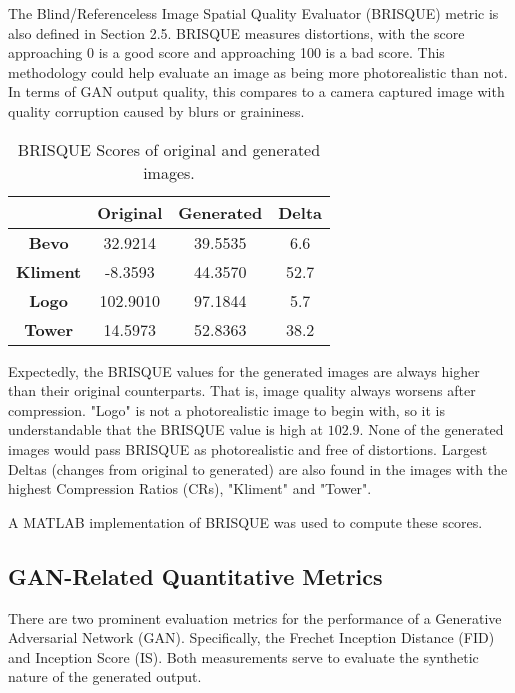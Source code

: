 The Blind/Referenceless Image Spatial Quality Evaluator (BRISQUE) metric is also defined in Section 2.5.
BRISQUE measures distortions, with the score approaching 0 is a good score and approaching 100 is a bad score. 
This methodology could help evaluate an image as being more photorealistic than not. 
In terms of GAN output quality, this compares to a camera captured image with quality corruption 
caused by blurs or graininess.

\begin{table}[H]
    \begin{center}
    \begin{tabular}{|c|c|c|c|}
    \hline
      & Original & Generated & Delta\\ [0.5ex] 
    \hline\hline
    \textbf{Bevo}	& 32.9214 & 39.5535 & 6.6\\
    \textbf{Kliment}	& -8.3593 & 44.3570 & 52.7\\
    \textbf{Logo}	& 102.9010 & 97.1844 & 5.7\\
    \textbf{Tower} & 14.5973 & 52.8363 & 38.2\\\hline
    
    \end{tabular}
    \caption[BRISQUE]{BRISQUE Scores of original and generated images.}
    \end{center}
    \end{table}

Expectedly, the BRISQUE values for the generated images are always higher than
their original counterparts. That is, image quality always worsens after compression. 
"Logo" is not a photorealistic image to begin with, 
so it is understandable that the BRISQUE value is high at $102.9$.
None of the generated images would pass BRISQUE as photorealistic and free of 
distortions. Largest Deltas (changes from original to generated) are also found in 
the images with the highest Compression Ratios (CRs), "Kliment" and "Tower".


A MATLAB implementation of BRISQUE was used to compute these scores.


\subsection{GAN-Related Quantitative Metrics}

There are two prominent evaluation metrics for the performance of a Generative Adversarial Network (GAN).
Specifically, the Frechet Inception Distance (FID) and Inception Score (IS). Both measurements serve to 
evaluate the synthetic nature of the generated output. 

